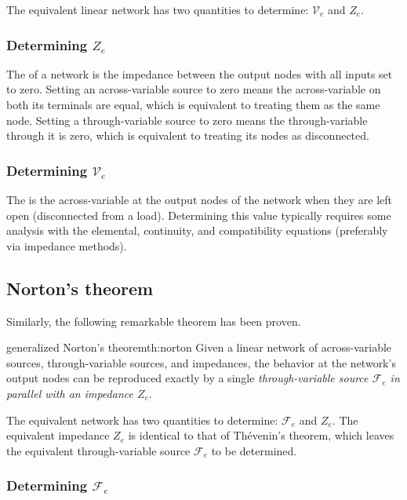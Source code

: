 \documentclass[dynamic_systems.tex]{subfiles}
\begin{document}
The equivalent linear network has two quantities to determine: $\mathcal{V}_e$ and $Z_e$.
\tags{}

\subsubsection{Determining $Z_e$}
\tags{}

The  of a network is the impedance between the output nodes with all inputs set to zero.
Setting an across-variable source to zero means the across-variable on both its terminals are equal, which is equivalent to treating them as the same node.
Setting a through-variable source to zero means the through-variable through it is zero, which is equivalent to treating its nodes as disconnected.
\tags{}

\subsubsection{Determining $\mathcal{V}_e$}
\tags{}

The  is the across-variable at the output nodes of the network when they are left open (disconnected from a load).
Determining this value typically requires some analysis with the elemental, continuity, and compatibility equations (preferably via impedance methods).
\tags{}

\subsection{Norton's theorem}
\tags{}

Similarly, the following remarkable theorem has been proven.
\tags{}

\begin{Theorem}{generalized Norton's theorem}{th:norton}
  Given a linear network of across-variable sources, through-variable sources, and impedances, the behavior at the network's output nodes can be reproduced exactly by a single \emph{through-variable source $\mathcal{F}_e$ in parallel with an impedance $Z_e$}.
\end{Theorem}

The equivalent network has two quantities to determine: $\mathcal{F}_e$ and $Z_e$.
The equivalent impedance $Z_e$ is identical to that of Th\'evenin's theorem, which leaves the equivalent through-variable source $\mathcal{F}_e$ to be determined.
\tags{}

\subsubsection{Determining $\mathcal{F}_e$}
\tags{}
\end{document}
